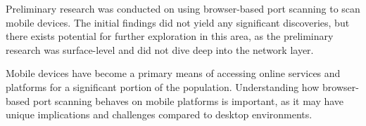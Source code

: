 Preliminary research was conducted on using browser-based port scanning to scan mobile devices. The initial findings did not yield any significant discoveries, but there exists potential for further exploration in this area, as the preliminary research was surface-level and did not dive deep into the network layer.

Mobile devices have become a primary means of accessing online services and platforms for a significant portion of the population. Understanding how browser-based port scanning behaves on mobile platforms is important, as it may have unique implications and challenges compared to desktop environments.




